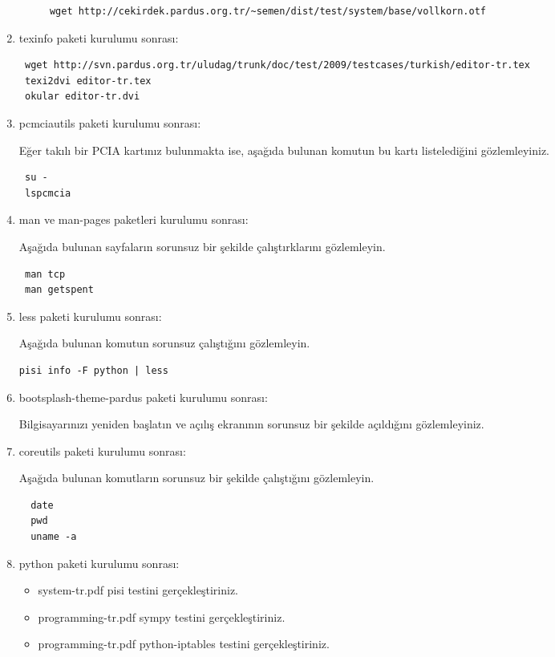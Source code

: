 \documentclass[a4paper,10pt]{article}
\begin{document}
\begin{enumerate}
\begin{itemize}
  \begin{verbatim}
  wget http://cekirdek.pardus.org.tr/~semen/dist/test/system/base/vollkorn.otf
  \end{verbatim}
\end{itemize}


\item texinfo paketi kurulumu sonrası:
\begin{verbatim}
 wget http://svn.pardus.org.tr/uludag/trunk/doc/test/2009/testcases/turkish/editor-tr.tex
 texi2dvi editor-tr.tex
 okular editor-tr.dvi
\end{verbatim}


\item pcmciautils paketi kurulumu sonrası:

Eğer takılı bir PCIA kartınız bulunmakta ise, aşağıda bulunan komutun bu kartı listelediğini gözlemleyiniz.
\begin{verbatim}
 su -
 lspcmcia
\end{verbatim}



\item man ve man-pages paketleri kurulumu sonrası:

Aşağıda bulunan sayfaların sorunsuz bir şekilde çalıştırklarını gözlemleyin.
\begin{verbatim}
 man tcp
 man getspent
\end{verbatim}


\item less paketi kurulumu sonrası:

Aşağıda bulunan komutun sorunsuz çalıştığını gözlemleyin.
\begin{verbatim}
pisi info -F python | less 
\end{verbatim}


\item bootsplash-theme-pardus paketi kurulumu sonrası:

Bilgisayarınızı yeniden başlatın ve açılış ekranının sorunsuz bir şekilde açıldığını gözlemleyiniz.

\item coreutils paketi kurulumu sonrası:

Aşağıda bulunan komutların sorunsuz bir şekilde çalıştığını gözlemleyin.
\begin{verbatim}
  date
  pwd
  uname -a
\end{verbatim}


\item python paketi kurulumu sonrası:
\begin{itemize}
 \item system-tr.pdf pisi testini gerçekleştiriniz.
 \item programming-tr.pdf sympy testini gerçekleştiriniz.
 \item programming-tr.pdf python-iptables testini gerçekleştiriniz.
\end{itemize}



\end{enumerate}
\end{document}
